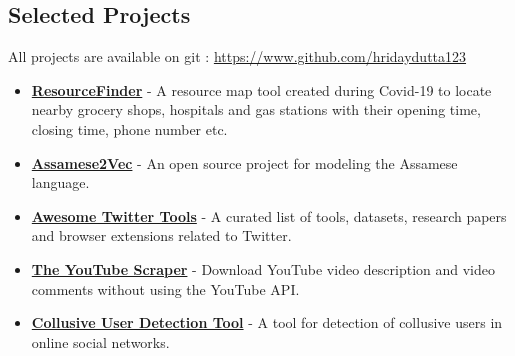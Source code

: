 \documentclass[margin, centered]{res}
\begin{document}
\begin{resume}
\section{Selected Projects}
All projects are available on git : \url{https://www.github.com/hridaydutta123}
\begin{itemize}[leftmargin=*]
 \item \textbf{\href{https://resource-finder.github.io/}{ResourceFinder}} - A resource map tool created during Covid-19 to locate nearby grocery shops, hospitals and gas stations with their opening time, closing time, phone number etc.

 \item \textbf{\href{https://github.com/hridaydutta123/Assamese2Vec}{Assamese2Vec}} - An open source project for modeling the Assamese language.

 \item \textbf{\href{https://github.com/hridaydutta123/awesome-twitter-tools}{Awesome Twitter Tools}} - A curated list of tools, datasets, research papers and browser extensions related to Twitter.

 \item \textbf{\href{https://github.com/hridaydutta123/the-youtube-scraper}{The YouTube Scraper}} - Download YouTube video description and video comments without using the YouTube API.

 \item \textbf{\href{https://github.com/hridaydutta123/collusive-user-detection-tool}{Collusive User Detection Tool}} - A tool for detection of collusive users in online social networks.


\end{itemize}
\end{resume}
\end{document}
